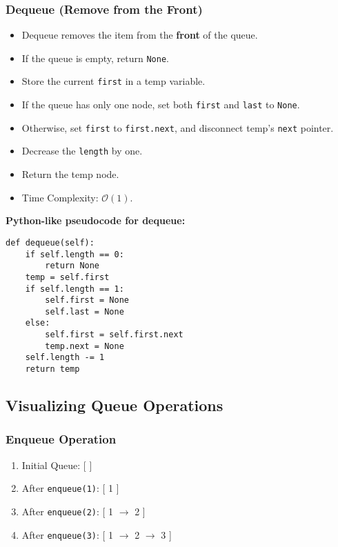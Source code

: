\subsubsection*{Dequeue (Remove from the Front)}

\begin{itemize}
    \item Dequeue removes the item from the \textbf{front} of the queue.
    \item If the queue is empty, return \texttt{None}.
    \item Store the current \texttt{first} in a temp variable.
    \item If the queue has only one node, set both \texttt{first} and \texttt{last} to \texttt{None}.
    \item Otherwise, set \texttt{first} to \texttt{first.next}, and disconnect temp's \texttt{next} pointer.
    \item Decrease the \texttt{length} by one.
    \item Return the temp node.
    \item Time Complexity: $\mathcal{O}(1)$.
\end{itemize}

\textbf{Python-like pseudocode for dequeue:}
\begin{verbatim}
def dequeue(self):
    if self.length == 0:
        return None
    temp = self.first
    if self.length == 1:
        self.first = None
        self.last = None
    else:
        self.first = self.first.next
        temp.next = None
    self.length -= 1
    return temp
\end{verbatim}

\subsection{Visualizing Queue Operations}

\subsubsection*{Enqueue Operation}
\begin{enumerate}
    \item Initial Queue: [ ]
    \item After \texttt{enqueue(1)}: [ 1 ]
    \item After \texttt{enqueue(2)}: [ 1 $\rightarrow$ 2 ]
    \item After \texttt{enqueue(3)}: [ 1 $\rightarrow$ 2 $\rightarrow$ 3 ]
\end{enumerate}

